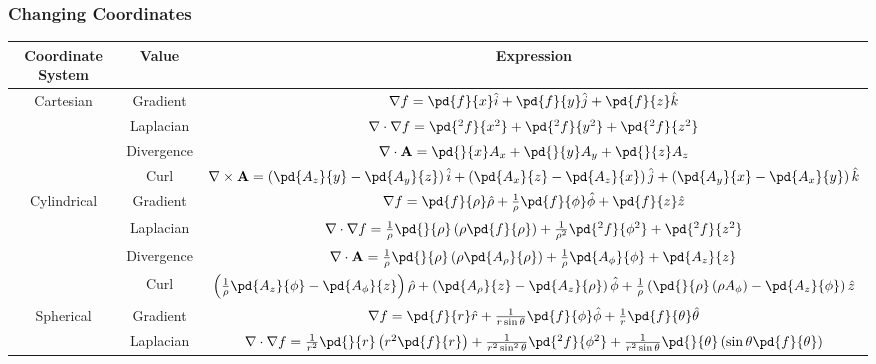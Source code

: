 \documentclass[10pt]{mypackage}
\begin{document}
\subsubsection{Changing Coordinates}%
\begin{table}
  \scriptsize
  \centering
  \renewcommand{\arraystretch}{2}
  \begin{tabular}{c|c|c}
    Coordinate System & Value & Expression\\
    \hline\hline
    \multirow[c]{4}{*}{Cartesian} & Gradient & $\nabla f = \pd{f}{x}\hat{i} + \pd{f}{y}\hat{j} + \pd{f}{z}\hat{k}$\\
                                 & Laplacian & $\nabla\cdot \nabla f = \pd{^2f}{x^2} + \pd{^2f}{y^2} + \pd{^2f}{z^2}$\\
                                 & Divergence & $\nabla \cdot \mathbf{A} = \pd{}{x}A_x + \pd{}{y}A_y + \pd{}{z}A_z$\\
                                 & Curl & $\nabla \times \mathbf{A} = \left(\pd{A_z}{y} - \pd{A_y}{z}\right)\hat{i} + \left(\pd{A_x}{z} - \pd{A_z}{x}\right)\hat{j} + \left(\pd{A_y}{x} - \pd{A_x}{y}\right)\hat{k}$\\
                                 \hline
    \multirow[c]{4}{*}{Cylindrical} & Gradient & $\nabla f = \pd{f}{\rho}\hat{\rho} + \frac{1}{\rho}\pd{f}{\phi}\hat{\phi} + \pd{f}{z}\hat{z}$\\
                                    & Laplacian & $\nabla \cdot \nabla f = \frac{1}{\rho}\pd{}{\rho}\left(\rho \pd{f}{\rho}\right) + \frac{1}{\rho^2}\pd{^2f}{\phi^2} + \pd{^2f}{z^2}$\\
                                    & Divergence & $\nabla \cdot \mathbf{A} = \frac{1}{\rho}\pd{}{\rho}\left(\rho\pd{A_{\rho}}{\rho}\right) + \frac{1}{\rho}\pd{A_{\phi}}{\phi} + \pd{A_z}{z}$\\
                                    & Curl & $\left(\frac{1}{\rho}\pd{A_z}{\phi} - \pd{A_{\phi}}{z}\right)\hat{\rho} + \left(\pd{A_\rho}{z} - \pd{A_z}{\rho}\right)\hat{\phi} + \frac{1}{\rho}\left(\pd{}{\rho}\left(\rho A_{\phi}\right) - \pd{A_z}{\phi}\right)\hat{z}$\\
                                    \hline
    \multirow[c]{4}{*}{Spherical} & Gradient & $\nabla f = \pd{f}{r}\hat{r} + \frac{1}{r\sin\theta}\pd{f}{\phi}\hat{\phi} + \frac{1}{r}\pd{f}{\theta}\hat{\theta}$\\
                                  & Laplacian & $\nabla \cdot \nabla f = \frac{1}{r^2}\pd{}{r}\left(r^2\pd{f}{r}\right) + \frac{1}{r^2\sin^2\theta}\pd{^2f}{\phi^2} + \frac{1}{r^2\sin\theta}\pd{}{\theta}\left(\sin\theta \pd{f}{\theta}\right)$\\

\end{tabular}
\end{table}
\end{document}
